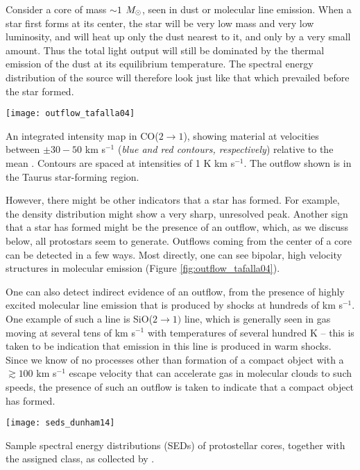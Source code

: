 Consider a core of mass $\sim 1$ $M_{\odot}$, seen in dust or molecular line emission. When a star first forms at its center, the star will be very low mass and very low luminosity, and will heat up only the dust nearest to it, and only by a very small amount. Thus the total light output will still be dominated by the thermal emission of the dust at its equilibrium temperature. The spectral energy distribution of the source will therefore look just like that which prevailed before the star formed.

\begin{marginfigure}
\texttt{[image: outflow\_tafalla04]}
\caption[Outflow in CO($2\rightarrow 1$)]{
\label{fig:outflow_tafalla04}
An integrated intensity map in CO($2\rightarrow 1$), showing material at velocities between $\pm 30-50$ km s$^{-1}$ (\textit{blue and red contours, respectively}) relative to the mean \citep{tafalla04c}. Contours are spaced at intensities of 1 K km s$^{-1}$. The outflow shown is in the Taurus star-forming region.
}
\end{marginfigure}

However, there might be other indicators that a star has formed. For example, the density distribution might show a very sharp, unresolved peak. Another sign that a star has formed might be the presence of an outflow, which, as we discuss below, all protostars seem to generate. Outflows coming from the center of a core can be detected in a few ways. Most directly, one can see bipolar, high velocity structures in molecular emission (Figure \ref{fig:outflow_tafalla04}).

One can also detect indirect evidence of an outflow, from the presence of highly excited molecular line emission that is produced by shocks at hundreds of km s$^{-1}$. One example of such a line is SiO($2\rightarrow 1)$ line, which is generally seen in gas moving at several tens of km s$^{-1}$ with temperatures of several hundred K -- this is taken to be indication that emission in this line is produced in warm shocks. Since we know of no processes other than formation of a compact object with a $\gtrsim 100$ km s$^{-1}$ escape velocity that can accelerate gas in molecular clouds to such speeds, the presence of such an outflow is taken to indicate that a compact object has formed.

\begin{marginfigure}
\texttt{[image: seds\_dunham14]}
\caption[Sample SEDs of protostellar cores]{
\label{fig:seds_dunham14}
Sample spectral energy distributions (SEDs) of protostellar cores, together with the assigned class, as collected by \citet{dunham14a}.
}
\end{marginfigure}

